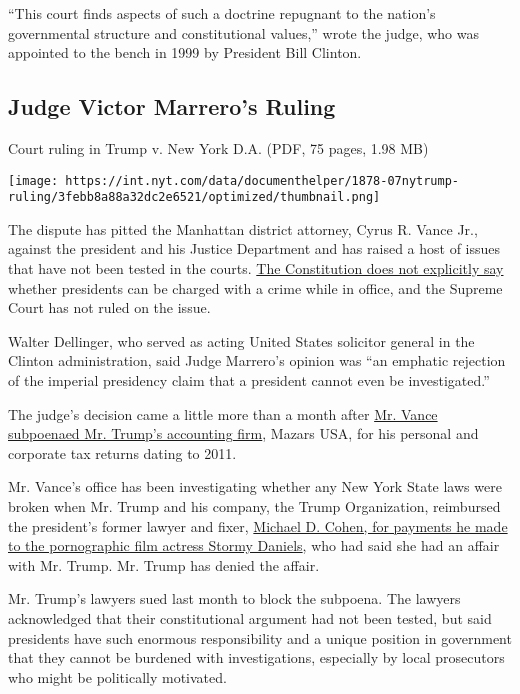 ``This court finds aspects of such a doctrine repugnant to the nation's
governmental structure and constitutional values,'' wrote the judge, who
was appointed to the bench in 1999 by President Bill Clinton.

\hypertarget{judge-victor-marreros-ruling}{%
\subsection{Judge Victor Marrero's
Ruling}\label{judge-victor-marreros-ruling}}

Court ruling in Trump v. New York D.A. (PDF, 75 pages, 1.98 MB)

\texttt{[image: https://int.nyt.com/data/documenthelper/1878-07nytrump-ruling/3febb8a88a32dc2e6521/optimized/thumbnail.png]}

The dispute has pitted the Manhattan district attorney, Cyrus R. Vance
Jr., against the president and his Justice Department and has raised a
host of issues that have not been tested in the courts.
\href{https://www.nytimes.com/2017/05/29/us/politics/a-constitutional-puzzle-can-the-president-be-indicted.html?module=inline}{The
Constitution does not explicitly say} whether presidents can be charged
with a crime while in office, and the Supreme Court has not ruled on the
issue.

Walter Dellinger, who served as acting United States solicitor general
in the Clinton administration, said Judge Marrero's opinion was ``an
emphatic rejection of the imperial presidency claim that a president
cannot even be investigated.''

The judge's decision came a little more than a month after
\href{https://www.nytimes.com/2019/09/16/nyregion/trump-tax-returns-cy-vance.html}{Mr.
Vance subpoenaed Mr. Trump's accounting firm}, Mazars USA, for his
personal and corporate tax returns dating to 2011.

Mr. Vance's office has been investigating whether any New York State
laws were broken when Mr. Trump and his company, the Trump Organization,
reimbursed the president's former lawyer and fixer,
\href{https://www.nytimes.com/2018/08/21/nyregion/michael-cohen-plea-deal-trump.html}{Michael
D. Cohen, for payments he made to the pornographic film actress Stormy
Daniels}, who had said she had an affair with Mr. Trump. Mr. Trump has
denied the affair.

Mr. Trump's lawyers sued last month to block the subpoena. The lawyers
acknowledged that their constitutional argument had not been tested, but
said presidents have such enormous responsibility and a unique position
in government that they cannot be burdened with investigations,
especially by local prosecutors who might be politically motivated.

